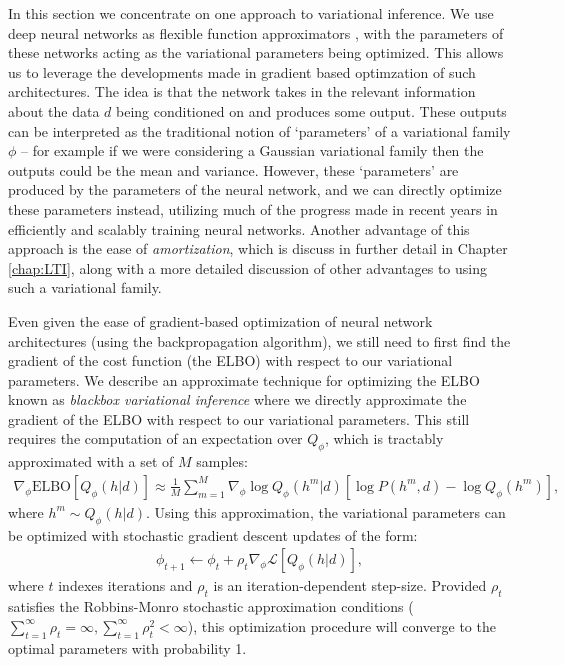 In this section we concentrate on one approach to variational inference. We use deep neural networks as flexible function approximators \citep{dayan1995helmholtz,kingma2014auto,mnih2014neural,rezende2015variational,paige2016inference}, with the parameters of these networks acting as the variational parameters being optimized. This allows us to leverage the developments made in gradient based optimzation of such architectures. The idea is that the network takes in the relevant information about the data $d$ being conditioned on and produces some output. These outputs can be interpreted as the traditional notion of `parameters' of a variational family $\phi$ -- for example if we were considering a Gaussian variational family then the outputs could be the mean and variance. However, these `parameters' are produced by the parameters of the neural network, and we can directly optimize these parameters instead, utilizing much of the progress made in recent years in efficiently and scalably training neural networks. Another advantage of this approach is the ease of \textit{amortization}, which is discuss in further detail in Chapter \ref{chap:LTI}, along with a more detailed discussion of other advantages to using such a variational family.

Even given the ease of gradient-based optimization of neural network architectures (using the backpropagation algorithm), we still need to first find the gradient of the cost function (the ELBO) with respect to our variational parameters. We describe an approximate technique for optimizing the ELBO known as \emph{blackbox variational inference} \citep{ranganath2014black} where we directly approximate the gradient of the ELBO with respect to our variational parameters. This still requires the computation of an expectation over $Q_\phi$, which is tractably approximated with a set of $M$ samples:
\begin{align}
    \nabla_\phi \text{ELBO}[Q_\phi(h|d)] \approx \frac{1}{M} \sum_{m=1}^M \nabla_\phi \log Q_\phi(h^m|d) \left[ \log P(h^m,d) - \log Q_\phi(h^m) \right],
\end{align}
where $h^m \sim Q_\phi(h|d)$. Using this approximation, the variational parameters can be optimized with stochastic gradient descent updates of the form:
\begin{align}
    \phi_{t+1} \leftarrow \phi_t + \rho_t \nabla_\phi \mathcal{L}[Q_\phi(h|d)],
\end{align}
where $t$ indexes iterations and $\rho_t$ is an iteration-dependent step-size. Provided $\rho_t$ satisfies the Robbins-Monro stochastic approximation conditions ($\sum_{t=1}^\infty \rho_t = \infty, \sum_{t=1}^\infty \rho_t^2 < \infty$), this optimization procedure will converge to the optimal parameters with probability 1.

